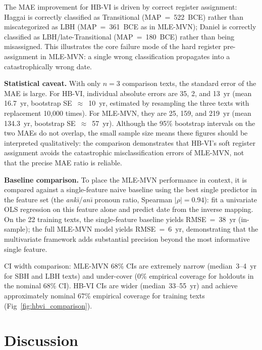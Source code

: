 \documentclass[10pt,letterpaper]{article}
\newcommand{\mvn}{MLE-MVN}
\newcommand{\hbvi}{HB-VI}
\begin{document}
The MAE improvement for \hbvi{} is driven by correct register
assignment: Haggai is correctly classified as Transitional (MAP~=~522~BCE)
rather than miscategorized as LBH (MAP~=~361~BCE as in \mvn{}); Daniel
is correctly classified as LBH/late-Transitional (MAP~=~180~BCE) rather
than being misassigned.  This illustrates the core failure mode of the
hard register pre-assignment in \mvn{}: a single wrong classification
propagates into a catastrophically wrong date.

\textbf{Statistical caveat.}  With only $n = 3$ comparison texts, the
standard error of the MAE is large.  For \hbvi{}, individual absolute
errors are 35, 2, and 13~yr (mean 16.7~yr, bootstrap SE~$\approx$~10~yr,
estimated by resampling the three texts with replacement 10{,}000 times).
For \mvn{}, they are 25, 159, and 219~yr (mean 134.3~yr, bootstrap
SE~$\approx$~57~yr).  Although the 95\% bootstrap intervals on the two
MAEs do not overlap, the small sample size means these figures should be
interpreted qualitatively: the comparison demonstrates that \hbvi{}'s
soft register assignment avoids the catastrophic misclassification errors
of \mvn{}, not that the precise MAE ratio is reliable.

\textbf{Baseline comparison.}  To place the \mvn{} performance in context,
it is compared against a single-feature naive baseline using the best
single predictor in the feature set (the \textit{ank\={\i}}/\textit{an\={\i}}
pronoun ratio, Spearman $|\rho| = 0.94$): fit a univariate OLS regression
on this feature alone and predict date from the inverse mapping.
On the 22 training texts, the single-feature baseline yields RMSE~=~38~yr
(in-sample); the full \mvn{} model yields RMSE~=~6~yr, demonstrating
that the multivariate framework adds substantial precision beyond the most
informative single feature.

CI width comparison: \mvn{} 68\% CIs are extremely narrow (median~3--4~yr
for SBH and LBH texts) and under-cover (0\% empirical coverage for
holdouts in the nominal 68\% CI).  \hbvi{} CIs are wider (median~33--55~yr)
and achieve approximately nominal 67\% empirical coverage for training
texts (Fig~\ref{fig:hbvi_comparison}).


\section*{Discussion}
\end{document}
